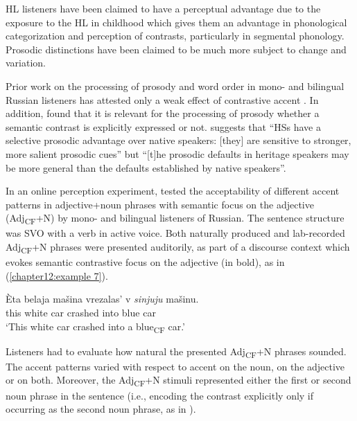 \documentclass[output=paper,colorlinks,citecolor=brown]{langscibook}
\begin{document}
HL listeners have been claimed to have a perceptual advantage \citep[11]{Polinsky_2018} due to the exposure to the HL in childhood which gives them an advantage in phonological categorization and perception of contrasts, particularly in segmental phonology. Prosodic distinctions have been claimed to be much more subject to change and variation.

Prior work on the processing of prosody and word order in mono- and bilingual Russian listeners has attested only a weak effect of contrastive accent \citep{Sekerina_Trueswell_2011}. In addition, \citet{Sekerina_Trueswell_2011} found that it is relevant for the processing of prosody whether a semantic contrast is explicitly expressed or not. \citet[161f]{Polinsky_2018} suggests that “HSs have a selective prosodic advantage over native speakers: [they] are sensitive to stronger, more salient prosodic cues” but “[t]he prosodic defaults in heritage speakers may be more general than the defaults established by native speakers”.

In an online perception experiment, \citet{Zerbian_Barabashova_2023} tested the acceptability of different accent patterns in adjective+noun phrases with semantic focus on the adjective (Adj\textsubscript{CF}+N) by mono- and bilingual listeners of Russian. The sentence structure was SVO with a verb in active voice. Both naturally produced and lab-recorded Adj\textsubscript{CF}+N phrases were presented auditorily, as part of a discourse context which evokes semantic contrastive focus on the adjective (in bold), as in (\ref{chapter12:example 7}).

\begin{exe}
    \ex
    \gll Èta belaja  mašina  vrezalas’ v      \textit{sinjuju} mašinu. \\
        this white car crashed into blue car \\
   \glt `This white car crashed into a blue\textsubscript{CF} car.'
\label{chapter12:example 7}
\end{exe}

Listeners had to evaluate how natural the presented Adj\textsubscript{CF}+N phrases sounded. The accent patterns varied with respect to accent on the noun, on the adjective or on both. Moreover, the Adj\textsubscript{CF}+N stimuli represented either the first or second noun phrase in the sentence (i.e., encoding the contrast explicitly only if occurring as the second noun phrase, as in ).
\end{document}
